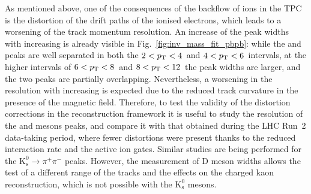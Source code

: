 As mentioned above, one of the consequences of the backflow of ions in the TPC is the distortion of the drift paths of the ionised electrons, which leads to a worsening of the track momentum resolution. An increase of the peak widths with increasing \pt is already visible in Fig.~\ref{fig:inv_mass_fit_pbpb}: while the \ds and \dpl peaks are well separated in both the $2<p_\mathrm{T}<4$~\gevc and $4<p_\mathrm{T}<6$~\gevc intervals, at the higher \pt intervals of $6<p_\mathrm{T}<8$~\gevc and $8<p_\mathrm{T}<12$~\gevc the peak widths are larger, and the two peaks are partially overlapping. Nevertheless, a worsening in the resolution with increasing \pt is expected due to the reduced track curvature in the presence of the magnetic field. Therefore, to test the validity of the distortion corrections in the reconstruction framework it is useful to study the resolution of the \ds and \dpl mesons peaks, and compare it with that obtained during the LHC Run~2 data-taking period, where fewer distortions were present thanks to the reduced interaction rate and the active ion gates. Similar studies are being performed for the $\mathrm{K^0_s}\rightarrow\pi^+\pi^-$ peaks. However, the measurement of D meson widths allows the test of a different \pt range of the tracks and the effects on the charged kaon reconstruction, which is not possible with the $\mathrm{K^0_s}$ mesons.  


